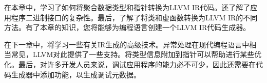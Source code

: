 在本章中，学习了如何将聚合数据类型和指针转换为LLVM IR代码。还了解了应用程序二进制接口的复杂性。最后，了解了将类和虚函数转换为LLVM IR的不同方法。有了本章的知识，您将能够为编程语言创建一个LLVM IR代码生成器。

在下一章中，将学习一些有关IR生成的高级技术。异常处理在现代编程语言中相当常见，LLVM对此提供了一些支持。将类型信息附加到指针可以帮助进行某些优化。最后，对许多开发人员来说，调试应用程序的能力必不可少，因此还需要在代码生成器中添加功能，以生成调试元数据。